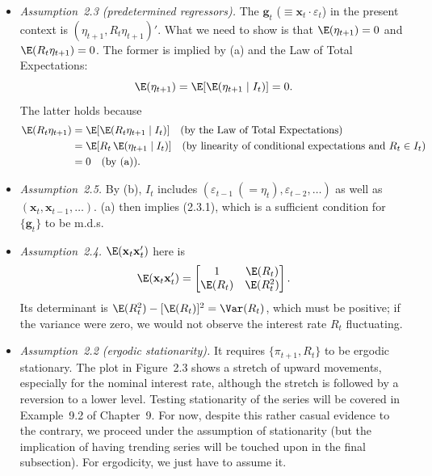 \begin{itemize}
\item \emph{Assumption~2.3 (predetermined regressors).}\quad
The $\mathbf{g}_t$ ($\equiv \mathbf{x}_t \cdot \varepsilon_t$) in the present
context is $(\eta_{t+1}, R_t\eta_{t+1})'$. What we need to show is that
$\E(\eta_{t+1}) = 0$ and $\E(R_t\eta_{t+1}) = 0$. The former is implied by (a) and the Law of Total Expectations:
%
\begin{equation}
\E(\eta_{t+1}) = \E[\E(\eta_{t+1} \mid I_t)] = 0.
\label{eq:2.11.6}
\end{equation}
%
The latter holds because
%
\begin{align}
\E(R_t\eta_{t+1})
&= \E[\E(R_t\eta_{t+1} \mid I_t)]
  \quad \text{(by the Law of Total Expectations)} \notag \\
&= \E[R_t\,\E(\eta_{t+1} \mid I_t)]
  \quad \text{(by linearity of conditional expectations and }
  R_t \in I_t\text{)} \notag \\
&= 0 \quad \text{(by (a))}.
\label{eq:2.11.7}
\end{align}

\item \emph{Assumption~2.5.}\quad
By (b), $I_t$ includes $(\varepsilon_{t-1}\ (= \eta_t), \varepsilon_{t-2}, \ldots)$ as well as
$(\mathbf{x}_t, \mathbf{x}_{t-1}, \ldots)$. (a) then implies (2.3.1), which is a sufficient condition for
$\{\mathbf{g}_t\}$ to be m.d.s.

\item \emph{Assumption~2.4.}\quad
$\E(\mathbf{x}_t\mathbf{x}_t')$ here is
%
\begin{equation}
\E(\mathbf{x}_t\mathbf{x}_t') = \begin{bmatrix}
1 & \E(R_t) \\ \E(R_t) & \E(R_t^2)
\end{bmatrix}.
\label{eq:2.11.8}
\end{equation}
%
Its determinant is $\E(R_t^2) - [\E(R_t)]^2 = \Var(R_t)$, which must be positive; if the
variance were zero, we would not observe the interest rate $R_t$ fluctuating.

\item \emph{Assumption~2.2 (ergodic stationarity).}\quad
It requires $\{\pi_{t+1}, R_t\}$ to be ergodic stationary. The plot in Figure~2.3 shows a stretch of upward movements, especially
for the nominal interest rate, although the stretch is followed by a reversion to a
lower level. Testing stationarity of the series will be covered in Example~9.2 of
Chapter~9. For now, despite this rather casual evidence to the contrary, we proceed under the assumption of stationarity (but the implication of having trending
series will be touched upon in the final subsection). For ergodicity, we just have
to assume it.
\end{itemize}

